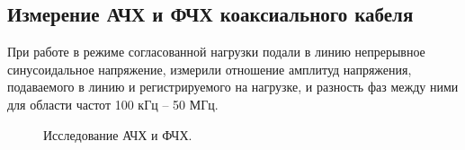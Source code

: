 \documentclass[12pt]{article}
\begin{document}
\begin{flushleft}
\subsection{Измерение АЧХ и ФЧХ коаксиального кабеля}
При работе в режиме согласованной нагрузки подали в линию непрерывное синусоидальное напряжение, измерили отношение амплитуд напряжения, подаваемого в линию и регистрируемого на нагрузке, и разность фаз между ними для области частот 100 кГц – 50 МГц.

\begin{figure}[!h]
\caption{Исследование АЧХ и ФЧХ.}
\label{ris:image}
\end{figure}

\end{flushleft}
\end{document}
